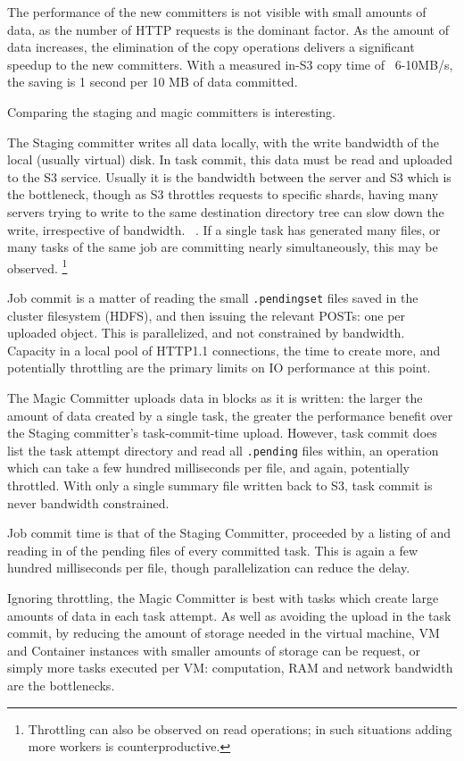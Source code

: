 \documentclass[format=acmsmall, screen=true, review=false]{acmart}
\begin{document}
The performance of the new committers is not visible with small amounts
of data, as the number of HTTP requests is the dominant factor.
As the amount of data increases, the elimination of the copy operations
delivers a significant speedup to the new committers.
With a measured in-S3 copy time of ~6-10MB/s, the saving is 1 second per 10 MB
of data committed.

Comparing the staging and magic committers is interesting.

The Staging committer writes all data locally, with the write bandwidth
of the local (usually virtual) disk.
In task commit, this data must be read and uploaded to the S3 service.
Usually it is the bandwidth between the server and S3 which is the bottleneck,
though as S3 throttles requests to specific shards, having many servers trying
to write to the same destination directory tree can slow down the write, irrespective
of bandwidth.
\ \cite{AWS-S3-throttling}.
If a single task has generated many files, or many tasks of the same job are
committing nearly simultaneously, this may be observed.
\footnote{Throttling can also be observed on read operations;
in such situations adding more workers is counterproductive.}

Job commit is a matter of reading the small \texttt{.pendingset} files saved in the
cluster filesystem (HDFS), and then issuing the relevant POSTs: one per uploaded
object.
This is parallelized, and not constrained by bandwidth.
Capacity in a local pool of HTTP1.1 connections, the time to create more,
and potentially throttling are the primary limits on IO performance at this point.

The Magic Committer uploads data in blocks as it is written: the larger
the amount of data created by a single task, the greater the performance
benefit over the Staging committer's task-commit-time upload.
However, task commit does list the task attempt directory and read all \texttt{.pending}
files within, an operation which can take a few hundred milliseconds per file,
and again, potentially throttled.
With only a single summary file written back to S3, task commit is never
bandwidth constrained.

Job commit time is that of the Staging Committer, proceeded by a listing
of and reading in of the pending files of every committed task.
This is again a few hundred milliseconds per file, though parallelization
can reduce the delay.

Ignoring throttling, the Magic Committer is best with tasks which create
large amounts of data in each task attempt.
As well as avoiding the upload in the task commit, by reducing the
amount of storage needed in the virtual machine, VM and Container instances
with smaller amounts of storage can be request, or simply more tasks executed
per VM: computation, RAM and network bandwidth are the bottlenecks.
\end{document}
